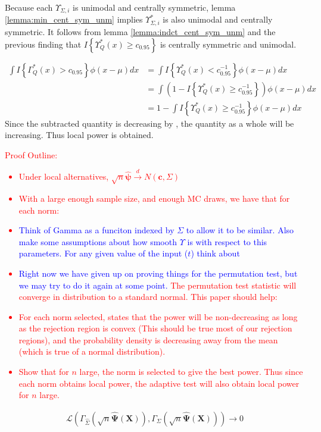 \documentclass{article}
\newcommand{\sh}{\textcolor{red}}
\newcommand{\vmat}{\Sigma}
\newcommand{\gi}{\Upsilon}
\begin{document}
Because each $\gi_{\Sigma, i}$ is unimodal and centrally symmetric, lemma \ref{lemma:min_cent_sym_unm} implies $\gi^*_{\Sigma, i}$ is also unimodal and centrally symmetric. It follows from lemma \ref{lemma:indct_cent_sym_unm} and the previous finding that $I\left\{\gi^*_Q(x) \geq c_{0.95}\right\}$ is centrally symmetric and unimodal.  

\begin{align*}
	\int I\left\{\Gamma^*_Q(x) > c_{0.95}\right\} \phi(x - \mu) dx &= \int I\left\{\gi^*_Q(x) < c_{0.95}^{-1}\right\} \phi(x - \mu) dx\\
	& = \int \left(1 - I\left\{\gi^*_Q(x) \geq c^{-1}_{0.95}\right\}\right)\phi(x - \mu) dx
	\\
	&= 1 - \int I\left\{\gi^*_Q(x) \geq c^{-1}_{0.95}\right\} \phi(x - \mu) dx
\end{align*}
Since the subtracted quantity is decreasing by \citep{anderson_integral_1955}, the quantity as a whole will be increasing.  Thus local power is obtained.


\sh{Proof Outline: \\
\begin{itemize}
	\item Under local alternatives, $\sqrt{n}\hat{\boldsymbol{\psi}} \xrightarrow{d} N(\boldsymbol{c}, \Sigma)$
	\item With a large enough sample size, and enough MC draws, we have that for each norm: 
    \item \textcolor{blue}{Think of Gamma as a funciton indexed by $\Sigma$ to allow it to be similar.  Also make some assumptions about how smooth $\gi$ is with respect to this parameters. For any given value of the input ($t$) think about }
	\item \textcolor{blue}{Right now we have given up on proving things for the permutation test, but we may try to do it again at some point.} The permutation test statistic will converge in distribution to a standard normal.  This paper should help: \citep{omelka_testing_2012}
	\item For each norm selected, \citep{gupta_inequalitites_1972} states that the power will be non-decreasing as long as the rejection region is convex (This should be true most of our rejection regions), and the probability density is decreasing away from the mean (which is true of a normal distribution).  
	\item Show that for $n$ large, the norm is selected to give the best power.  Thus since each norm obtains local power, the adaptive test will also obtain local power for $n$ large.
\end{itemize}} 
\begin{align*}
	\mathcal{L}\left(\Gamma_{\hat{\vmat}}\left(\sqrt{n} \hat{\boldsymbol{\Psi}}(\boldsymbol{X})\right), \Gamma_{\vmat}\left(\sqrt{n} \hat{\boldsymbol{\Psi}}(\boldsymbol{X})\right)\right) \rightarrow 0
\end{align*}
\end{document}

